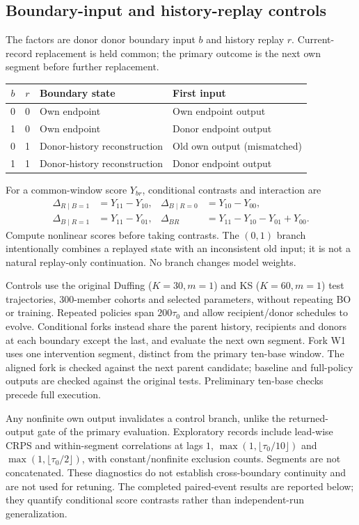 \documentclass[gmd,manuscript]{copernicus}
\begin{document}
\subsection{Boundary-input and history-replay controls}\label{app:note5}
The factors are donor donor boundary input $b$ and history replay $r$. Current-record replacement is held common; the primary outcome is the next own segment before further replacement.

\begin{center}\small
\begin{tabularx}{\textwidth}{ccXX}
\toprule
$b$ & $r$ & Boundary state & First input \\ \midrule
0 & 0 & Own endpoint & Own endpoint output \\
1 & 0 & Own endpoint & Donor endpoint output \\
0 & 1 & Donor-history reconstruction & Old own output (mismatched) \\
1 & 1 & Donor-history reconstruction & Donor endpoint output \\
\bottomrule\end{tabularx}
\end{center}

For a common-window score $Y_{br}$, conditional contrasts and interaction are
\begin{align}
\Delta_{R\mid B=1}&=Y_{11}-Y_{10}, & \Delta_{B\mid R=0}&=Y_{10}-Y_{00},\\
\Delta_{B\mid R=1}&=Y_{11}-Y_{01}, & \Delta_{BR}&=Y_{11}-Y_{10}-Y_{01}+Y_{00}.
\end{align}
Compute nonlinear scores before taking contrasts. The $(0,1)$ branch intentionally combines a replayed state with an inconsistent old input; it is not a natural replay-only continuation. No branch changes model weights.

Controls use the original Duffing ($K=30,m=1$) and KS ($K=60,m=1$) test trajectories, 300-member cohorts and selected parameters, without repeating BO or training. Repeated policies span $200\tau_0$ and allow recipient/donor schedules to evolve. Conditional forks instead share the parent history, recipients and donors at each boundary except the last, and evaluate the next own segment. Fork W1 uses one intervention segment, distinct from the primary ten-base window. The aligned fork is checked against the next parent candidate; baseline and full-policy outputs are checked against the original tests. Preliminary ten-base checks precede full execution.

Any nonfinite own output invalidates a control branch, unlike the returned-output gate of the primary evaluation. Exploratory records include lead-wise CRPS and within-segment correlations at lags $1$, $\max(1,\lfloor\tau_0/10\rfloor)$ and $\max(1,\lfloor\tau_0/2\rfloor)$, with constant/nonfinite exclusion counts. Segments are not concatenated. These diagnostics do not establish cross-boundary continuity and are not used for retuning. The completed paired-event results are reported below; they quantify conditional score contrasts rather than independent-run generalization.
\end{document}
